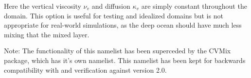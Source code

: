 Here the vertical viscosity $\nu_v$ and diffusion $\kappa_v$ are simply constant throughout the domain.  This option is useful for testing and idealized domains but is not appropriate for real-world simulations, as the deep ocean should have much less mixing that the mixed layer.

Note: The functionality of this namelist has been superceded by the CVMix package, which has it's own namelist.  This namelist has been kept for backwards compatibility with and verification against version 2.0.
